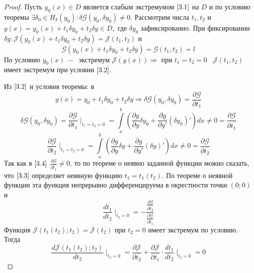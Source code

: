 \begin{proof}
Пусть $y_0(x)\in D$ является слабым экстремумом $\ref{3.1}$ на $D$ и по условию теоремы $\exists \delta_0\in H_\delta(y_0): \delta\mathcal{G}(y_0,\delta y_0)\neq 0$. Рассмотрим числа $t_1, t_2$ и $y(x)=y_0(x)+t_1\delta y_0 + t_2 \delta y \in D,$ где $\delta y_0$ зафиксированно. При фиксировании $\delta y: \mathcal{J}(y_0(x)+t_1\delta y_0+t_2 \delta y)=\mathcal{J}(t_1,t_2)$ и \begin{equation}
    \label{3.3}
    \tag{3.3}
    \mathcal{G}(y_0(x)+t_1\delta y_0+t_2 \delta y)=\mathcal{G}(t_1,t_2)=l
\end{equation}
По условию $y_0(x)~-~$ экстремум $\mathcal{J}(y(x))\Rightarrow$ при $t_1=t_2=0\;\;\;\mathcal{J}(t_1,t_2)$ имеет экстремум при условии $\ref{3.2}$.\par
Из $\ref{3.2}$ и условия теоремы: в $$y(x)=y_0+t_1\delta y_0+t_2\delta y\Rightarrow \delta \mathcal{G}(y_0,\delta y_0)=\frac{\partial \mathcal{G}}{\partial t_1}$$$$\delta \mathcal{G}(y_0,\delta y_0)=\frac{\partial \mathcal{G}}{\partial t_1}\mid_{t_1=t_2=0}=\int\limits_a^b(\frac{\partial g}{\partial y}\delta y_0+\frac{\partial g}{\partial y'}(\delta y_0)')dx\neq0=\frac{\partial \mathcal{G}}{\partial\overline{t_1}}$$
\begin{equation}
\frac{\partial \mathcal{G}}{\partial t_2}\mid_{t_1=t_2=0}=\int\limits_a^b(\frac{\partial g}{\partial y}\delta y+\frac{\partial g}{\partial y'}(\delta y)')dx\neq0=\frac{\partial \mathcal{G}}{\partial\overline{t_2}}
\label{3.4}\tag{3.4}
\end{equation}
Так как в $\ref{3.4}$ $\frac{\partial \mathcal{G}}{\partial \overline{t_1}}\neq 0$, то по теореме о неявно заданной функции можно сказать, что $\ref{3.3}$ определяет неявную функцию $t_1=t_1(t_2)$. По теореме о неявной функции эта функция непрерывно дифференцируема в окрестности точки $(0;0)$ и \begin{equation}
    \frac{dt_1}{dt_2}\mid_{t_2=0}=-\frac{\frac{\partial \mathcal{G}}{\partial \overline{t_2}}}{\frac{\partial \mathcal{G}}{\partial \overline{t_1}}}
    \label{3.5}
    \tag{3.5}
    \end{equation}
Функция $\mathcal{J}(t_1(t_2);t_2)=\overline{\mathcal{J}}(t_2)$ при $t_2=0$ имеет экстремум по условию. Тогда \begin{equation}
    \frac{d\mathcal{J}(t_1(t_2);t_2)}{dt_2}\mid_{t_2=0}=\frac{\partial \mathcal{J}}{\partial \overline{t_2}}+ \frac{\partial \mathcal{J}}{\partial \overline{t_1}}\cdot \frac{d t_1}{d t_2}\mid_{t_2=0}=0
    \tag{3.6}
    \label{3.6}
    \end{equation}

\end{proof}
